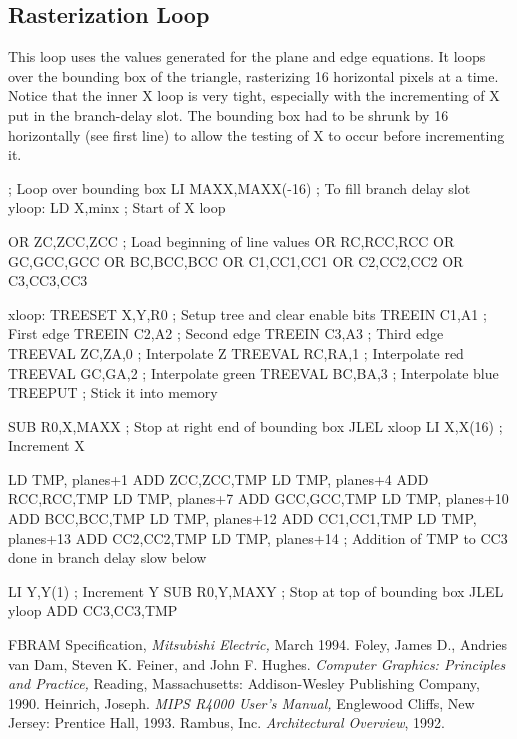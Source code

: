\documentclass{book}
\begin{document}
\subsection{Rasterization Loop}

This loop uses the values generated for the plane and edge equations.
It loops over the bounding box of the triangle, rasterizing 16 horizontal
pixels at a time.  Notice that the inner X loop is very tight, especially
with the incrementing of X put in the branch-delay slot.  The bounding box
had to be shrunk by 16 horizontally (see first line) to allow the testing
of X to occur before incrementing it.

\begin{verbatimtab}
    ; Loop over bounding box
    LI	    MAXX,MAXX(-16)	; To fill branch delay slot
yloop:
    LD	    X,minx		; Start of X loop

    OR	    ZC,ZCC,ZCC		; Load beginning of line values
    OR	    RC,RCC,RCC
    OR	    GC,GCC,GCC
    OR	    BC,BCC,BCC
    OR	    C1,CC1,CC1
    OR	    C2,CC2,CC2
    OR	    C3,CC3,CC3

xloop:
    TREESET X,Y,R0		; Setup tree and clear enable bits
    TREEIN  C1,A1		; First edge
    TREEIN  C2,A2		; Second edge
    TREEIN  C3,A3		; Third edge
    TREEVAL ZC,ZA,0		; Interpolate Z
    TREEVAL RC,RA,1		; Interpolate red
    TREEVAL GC,GA,2		; Interpolate green
    TREEVAL BC,BA,3		; Interpolate blue
    TREEPUT			; Stick it into memory

    SUB	    R0,X,MAXX		; Stop at right end of bounding box
    JLEL    xloop
    LI	    X,X(16)		; Increment X

    LD	    TMP, planes+1
    ADD	    ZCC,ZCC,TMP
    LD	    TMP, planes+4
    ADD	    RCC,RCC,TMP
    LD	    TMP, planes+7
    ADD	    GCC,GCC,TMP
    LD	    TMP, planes+10
    ADD	    BCC,BCC,TMP
    LD	    TMP, planes+12
    ADD	    CC1,CC1,TMP
    LD	    TMP, planes+13
    ADD	    CC2,CC2,TMP
    LD	    TMP, planes+14
    ; Addition of TMP to CC3 done in branch delay slow below
    
    LI	    Y,Y(1)		; Increment Y
    SUB	    R0,Y,MAXY		; Stop at top of bounding box
    JLEL    yloop
    ADD	    CC3,CC3,TMP
\end{verbatimtab}

\begin{thebibliography}{99}
FBRAM Specification, {\em Mitsubishi Electric,} March 1994.
Foley, James D., Andries van Dam, Steven K. Feiner, and
John F. Hughes.  {\em Computer Graphics: Principles and Practice,}
Reading, Massachusetts: Addison-Wesley Publishing Company, 1990.
Heinrich, Joseph.  {\em MIPS R4000 User's Manual,}
Englewood Cliffs, New Jersey: Prentice Hall, 1993.
Rambus, Inc. {\em Architectural Overview}, 1992.
\end{thebibliography}


\end{document}

